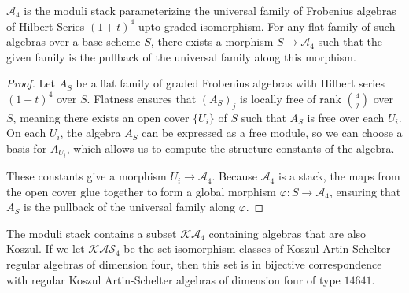 \documentclass{amsart}
\begin{document}
\begin{theorem}
   $\mathcal{A}_4$ is the moduli stack parameterizing the universal family of Frobenius algebras of Hilbert Series $(1+t)^4$ upto graded isomorphism. For any flat family of such algebras over a base scheme $S$, there exists a morphism $S \to \mathcal{A}_4$ such that the given family is the pullback of the universal family along this morphism.
\end{theorem}
\begin{proof} Let \( A_S \) be a flat family of graded Frobenius algebras with Hilbert series $(1+t)^4$ 
over \( S \). Flatness ensures that \( (A_S)_j \) is locally free of rank $\binom{4}{j}$ over \( S \), meaning there exists an open cover \( \{ U_i \} \) of \( S \) such that \( A_S \) is free over each \( U_i \). On each \( U_i \), the algebra \( A_S \) can be expressed as a free module, so we can choose a basis for \( A_{U_i} \), which allows us to compute the structure constants of the algebra.

These constants give a morphism \( U_i \to \mathcal{A}_4 \). Because \( \mathcal{A}_4 \) is a stack, the maps from the open cover glue together to form a global morphism \( \varphi: S \to \mathcal{A}_4 \), ensuring that \( A_S \) is the pullback of the universal family along \( \varphi \).
\end{proof}

The moduli stack contains a subset $\mathcal{KA}_4$ containing algebras that are also Koszul.  If we let $\mathcal{KAS}_4$ be the set isomorphism classes of
Koszul Artin-Schelter regular algebras of dimension four, then this set is in bijective correspondence with regular Koszul Artin-Schelter algebras of dimension four of type $14641.$
\end{document}

